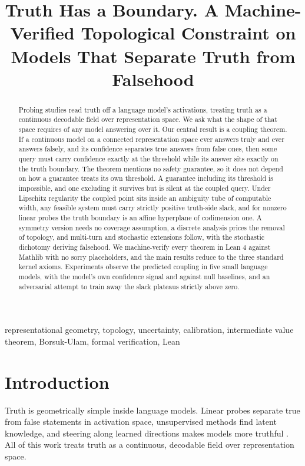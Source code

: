 \documentclass[mlmain,onecolumn]{jmlr}
\title[Truth Has a Boundary]{Truth Has a Boundary. A Machine-Verified
Topological Constraint on Models That Separate Truth from
Falsehood}
\begin{document}
\maketitle

\begin{abstract}
Probing studies read truth off a language model's activations,
treating truth as a continuous decodable field over representation
space. We ask what the shape of that space requires of any model
answering over it. Our central result is a coupling theorem. If a
continuous model on a connected representation space ever answers
truly and ever answers falsely, and its confidence separates true
answers from false ones, then some query must carry confidence
exactly at the threshold while its answer sits exactly on the truth
boundary. The theorem mentions no safety guarantee, so it
does not depend on how a guarantee treats its own threshold. A
guarantee including its threshold is impossible, and one excluding
it survives but is silent at the coupled query. Under Lipschitz
regularity the coupled point sits inside an ambiguity tube of
computable width, any feasible system must carry strictly positive
truth-side slack, and for nonzero linear probes the truth boundary
is an affine hyperplane of codimension one. A symmetry version
needs no coverage assumption, a discrete analysis prices the
removal of topology, and multi-turn and stochastic extensions
follow, with the stochastic dichotomy deriving falsehood. We
machine-verify every theorem in Lean 4 against Mathlib with no
sorry placeholders, and the main results reduce to the three
standard kernel axioms. Experiments observe the predicted coupling
in five
small language models, with the model's own confidence signal and
against null baselines, and an adversarial attempt to train away
the slack plateaus strictly above zero.
\end{abstract}

\begin{keywords}
representational geometry, topology, uncertainty, calibration,
intermediate value theorem, Borsuk-Ulam, formal verification, Lean
\end{keywords}

\section{Introduction}
\label{sec:intro}

Truth is geometrically simple inside language models. Linear probes
separate true from false statements in activation space,
unsupervised methods find latent knowledge, and steering along
learned directions makes models more truthful
\citep{marks2024geometry,azaria2023internal,burns2023discovering,li2023inference,zou2023representation}.
All of this work treats truth as a continuous, decodable field over
representation space.
\end{document}
